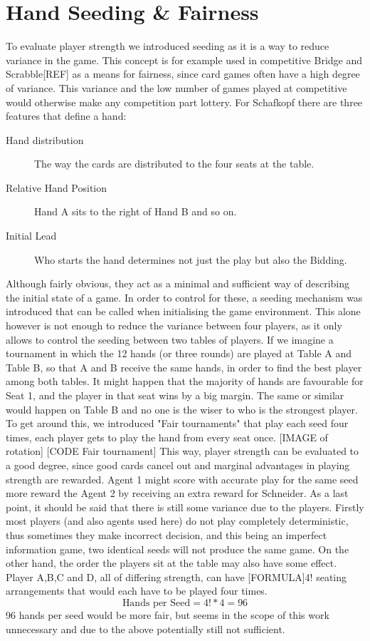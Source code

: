 \section{Hand Seeding \& Fairness}
To evaluate player strength we introduced seeding as it is a way to reduce variance in the game.
This concept is for example used in competitive Bridge and Scrabble[REF] as a means for fairness, since card games
often have a high degree of variance.
This variance and the low number of games played at competitive would otherwise make any competition part lottery.
\newline
For Schafkopf there are three features that define a hand:
\begin{description}
    \item [Hand distribution] The way the cards are distributed to the four seats at the table.
    \item [Relative Hand Position] Hand A sits to the right of Hand B and so on.
    \item [Initial Lead] Who starts the hand determines not just the play but also the Bidding.
\end{description}
Although fairly obvious, they act as a minimal and sufficient way of describing the initial state of a game.
In order to control for these, a seeding mechanism was introduced that can be called when initialising the game
environment.
This alone however is not enough to reduce the variance between four players, as it only allows to control the
seeding between two tables of players.
\newline
If we imagine a tournament in which the 12 hands (or three rounds) are played at Table A and Table B, so that A and B
receive the same hands, in order to find the best player among both tables.
It might happen that the majority of hands are favourable for Seat 1, and the player in that seat wins by a big margin.
The same or similar would happen on Table B and no one is the wiser to who is the strongest player.
\newline
To get around this, we introduced "Fair tournaments" that play each seed four times, each player gets to play the hand
from every seat once.
[IMAGE of rotation]
[CODE Fair tournament]
This way, player strength can be evaluated to a good degree, since good cards cancel out and marginal
advantages in playing strength are rewarded.
Agent 1 might score with accurate play for the same seed more reward the Agent 2 by receiving an extra reward for
Schneider.
\newline
As a last point, it should be said that there is still some variance due to the players.
Firstly most players (and also agents used here) do not play completely deterministic, thus sometimes they make
incorrect decision, and this being an imperfect information game, two identical seeds will not produce the same game.
\newline
On the other hand, the order the players sit at the table may also have some effect.
Player A,B,C and D, all of differing strength, can have [FORMULA]4! seating arrangements that would each have to be
played four times.
\[\text{Hands per Seed} = 4! * 4 = 96\]
96 hands per seed would be more fair, but seems in the scope of this work unnecessary and due to the above
potentially still not sufficient.


